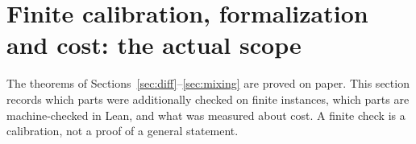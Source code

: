 \section{Finite calibration, formalization and cost: the actual scope}\label{sec:verif}

The theorems of Sections~\ref{sec:diff}--\ref{sec:mixing} are proved on paper. This section records
which parts were additionally checked on finite instances, which parts are machine-checked in Lean,
and what was measured about cost. A finite check is a calibration, not a proof of a general statement.

